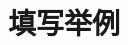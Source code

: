 \documentclass[zihao=-4]{ctexart}
\begin{document}
%	
%	
%	
	



\maketitle
\hypertarget{ux586bux5199ux8bf4ux660e-1}{%
\section{填写举例}\label{ux586bux5199ux8bf4ux660e-1}}
\end{document}
